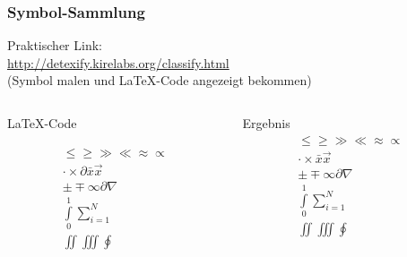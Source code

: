 \begin{frame}[fragile]
    \frametitle{Symbol-Sammlung}
    Praktischer Link: \\
    \href{http://detexify.kirelabs.org/classify.html}{http://detexify.kirelabs.org/classify.html} \\
    (Symbol malen und LaTeX-Code angezeigt bekommen)
    \begin{columns}[T]
        \begin{column}{0.7\textwidth}
            \begin{block}{\LaTeX-Code}
                \begin{lstverbatim}
                \begin{align}
                    \leq \geq \gg \ll \approx \propto \\
                    \cdot \times \partial \bar{x} \vec{x} \\
                    \pm \mp \infty \partial \nabla \\
                    \int\limits_0^1 \sum\limits_{i=1}^N \\
                    \iint \iiint \oint
                \end{align}
                \end{lstverbatim}
            \end{block}
        \end{column}
        \begin{column}{0.25\textwidth}
            \begin{block}{Ergebnis}
                \begin{align*}
                    \leq \geq \gg \ll \approx \propto \\
                    \cdot \times \bar{x} \vec{x} \\
                    \pm \mp \infty \partial \nabla \\
                    \int\limits_0^1 \sum\limits_{i=1}^N \\
                    \iint \iiint \oint
                \end{align*}
            \end{block}
        \end{column}
    \end{columns}
\end{frame}
